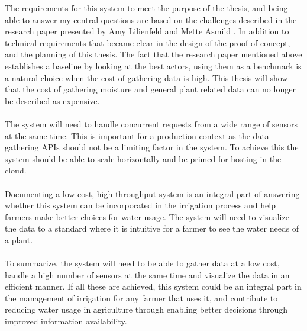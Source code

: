 \documentclass[]{uiophd}
\begin{document}
The requirements for this system to meet the purpose of the thesis, and being able to answer my central questions are based on the challenges described in the research paper presented by Amy Lilienfeld and Mette Asmild \cite{LILIENFELD200773}. In addition to technical requirements that became clear in the design of the proof of concept, and the planning of this thesis. The fact that the research paper mentioned above establishes a baseline by looking at the best actors, using them as a benchmark is a natural choice when the cost of gathering data is high. This thesis will show that the cost of gathering moisture and general plant related data can no longer be described as expensive.
\\\\
The system will need to handle concurrent requests from a wide range of sensors at the same time. This is important for a production context as the data gathering APIs should not be a limiting factor in the system. To achieve this the system should be able to scale horizontally and be primed for hosting in the cloud.
\\\\
Documenting a low cost, high throughput system is an integral part of answering whether this system can be incorporated in the irrigation process and help farmers make better choices for water usage. The system will need to visualize the data to a standard where it is intuitive for a farmer to see the water needs of a plant.
\\\\
To summarize, the system will need to be able to gather data at a low cost, handle a high number of sensors at the same time and visualize the data in an efficient manner. If all these are achieved, this system could be an integral part in the management of irrigation for any farmer that uses it, and contribute to reducing water usage in agriculture through enabling better decisions through improved information availability.
\end{document}
